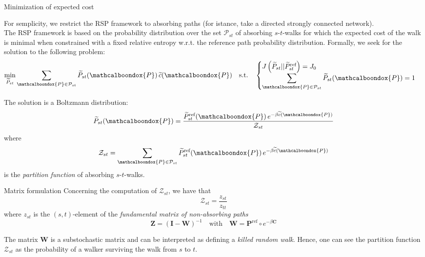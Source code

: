 \documentclass[13pt]{beamer}
\newcommand{\bondox}{\mathcalboondox}
\begin{document}
    \begin{frame}[t,allowframebreaks]{Minimization of expected cost}

    For semplicity, we restrict the RSP framework to absorbing paths (for istance, take a directed strongly connected network).\\
    \vspace{0.8em}
    The RSP framework is based on the probability distribution over the set $\mathcal{P}_{st}$ of absorbing $s$-$t$-walks for which the expected cost of the walk is minimal when constrained with a fixed relative entropy w.r.t. the reference path probability distribution. Formally, we seek for the solution to the following problem:
    \begin{equation*}
    \min_{\widetilde{P}_{st}}\sum_{\bondox{P}\in \mathcal{P}_{st}}\widetilde{P}_{st}(\bondox{P})\,\widetilde{c}(\bondox{P})\quad\text{s.t.}\quad \begin{cases}
    J\left(\widetilde{P}_{st}||\widetilde{P}_{st}^{\text{ref}}\right)=J_0 \\
    \displaystyle \sum_{\bondox{P}\in \mathcal{P}_{st}} \widetilde{P}_{st}(\bondox{P}) = 1
    \end{cases}
    \end{equation*}

    The solution is a Boltzmann distribution:
    \begin{equation*}
    \widetilde{P}_{st}(\bondox{P})=\frac{\widetilde{P}_{st}^{\text{ref}}(\bondox{P})\,e^{-\beta\widetilde{c}(\bondox{P})}}{\mathcal{Z}_{st}} 
    \end{equation*}
    where
    \begin{equation*}
    \mathcal{Z}_{st}=\sum_{\bondox{P}\in \mathcal{P}_{st}}\widetilde{P}_{st}^{\text{ref}}(\bondox{P})\,e^{-\beta\widetilde{c}(\bondox{P})}
    \end{equation*}
    is the \emph{partition function} of absorbing $s$-$t$-walks. 
    \end{frame}

    \begin{frame}[t,allowframebreaks]{Matrix formulation}
    Concerning the computation of $\mathcal{Z}_{st}$, we have that
    \begin{equation*}
    \mathcal{Z}_{st}=\frac{z_{st}}{z_{tt}} 
    \end{equation*}
    where $z_{st}$ is the $(s,t)$-element of the \emph{fundamental matrix of non-absorbing paths}
    \begin{equation*}
    \mathbf{Z}=(\mathbf{I}-\mathbf{W})^{-1}\quad\text{with}\quad \mathbf{W}=\mathbf{P}^{\text{ref}}\circ e^{-\beta\mathbf{C}}
    \end{equation*}
    
    The matrix $\mathbf{W}$ is a substochastic matrix and can be interpreted as defining a \emph{killed random walk}. Hence, one can see the partition function $\mathcal{Z}_{st}$ as the probability of a walker surviving the walk from $s$ to $t$.
    \end{frame}
\end{document}
